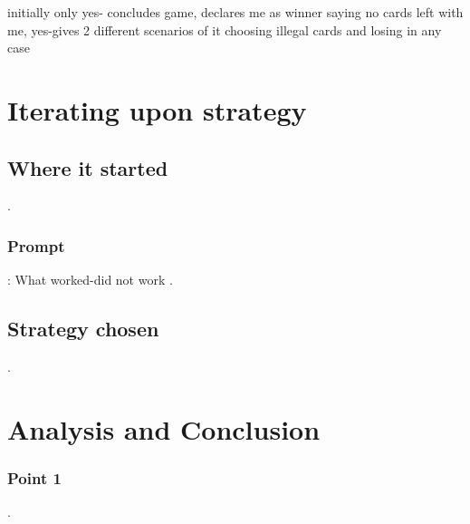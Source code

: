 \documentclass[runningheads]{llncs}
\begin{document}
initially only yes- concludes game, declares me as winner saying no cards left with me, yes-gives 2 different scenarios of it choosing illegal cards and losing in any case

\section{Iterating upon strategy}
\subsection{Where it started}
.
\subsubsection{Prompt}: What worked-did not work
.
\subsection{Strategy chosen}
.

\section{Analysis and Conclusion}
\subsubsection{Point 1}
.\\


% 
\end{document}
